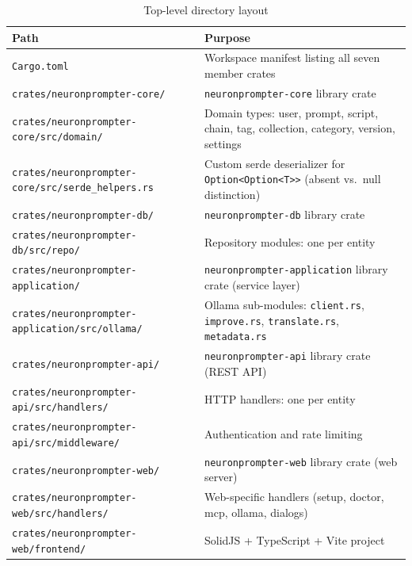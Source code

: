 \documentclass[a4paper, 11pt, oneside]{report}
\begin{document}
\begin{table}[H]
  \centering
  \caption{Top-level directory layout}
  \label{tab:dir-layout}
  \begin{tabularx}{\textwidth}{l X}
    \toprule
    \textbf{Path} & \textbf{Purpose} \\
    \midrule
    \texttt{Cargo.toml}            & Workspace manifest listing all seven member crates \\
    \texttt{crates/neuronprompter-core/}          & \texttt{neuronprompter-core} library crate \\
    \texttt{crates/neuronprompter-core/src/domain/} & Domain types: user, prompt, script, chain,
                                       tag, collection, category, version, settings \\
    \texttt{crates/neuronprompter-core/src/serde\_helpers.rs} & Custom serde deserializer for
                                       \texttt{Option<Option<T>{}>} (absent vs.\ null distinction) \\
    \texttt{crates/neuronprompter-db/}            & \texttt{neuronprompter-db} library crate \\
    \texttt{crates/neuronprompter-db/src/repo/}   & Repository modules: one per entity \\
    \texttt{crates/neuronprompter-application/}   & \texttt{neuronprompter-application} library crate
                                     (service layer) \\
    \texttt{crates/neuronprompter-application/src/ollama/} & Ollama sub-modules: \texttt{client.rs},
                                              \texttt{improve.rs}, \texttt{translate.rs},
                                              \texttt{metadata.rs} \\
    \texttt{crates/neuronprompter-api/}           & \texttt{neuronprompter-api} library crate (REST API) \\
    \texttt{crates/neuronprompter-api/src/handlers/} & HTTP handlers: one per entity \\
    \texttt{crates/neuronprompter-api/src/middleware/} & Authentication and rate limiting \\
    \texttt{crates/neuronprompter-web/}           & \texttt{neuronprompter-web} library crate (web server) \\
    \texttt{crates/neuronprompter-web/src/handlers/} & Web-specific handlers (setup, doctor, mcp, ollama,
                                        dialogs) \\
    \texttt{crates/neuronprompter-web/frontend/}  & SolidJS + TypeScript + Vite project \\

\end{tabularx}
\end{table}
\end{document}
